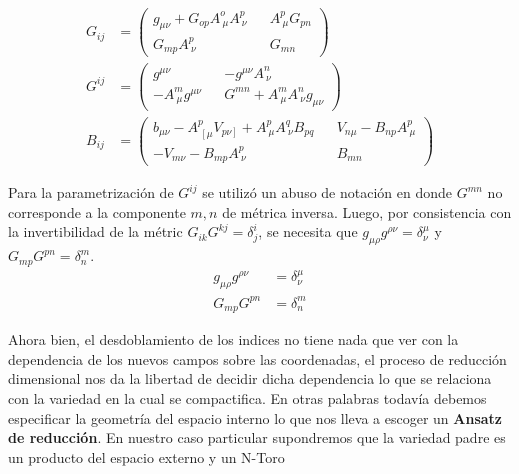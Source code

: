 \documentclass{article}
\numberwithin{equation}{section}
\begin{document}
\begin{subequations}
\begin{align}
\label{Gdown}
G_{i j}&= 
\begin{pmatrix}
g_{\mu \nu} + G_{o p} A^o_{\ \mu} A^p_{\ \nu} && A^p_{\ \mu} G_{p n}\\
G_{m p} A^p_{\ \nu}  && G_{m n}
\end{pmatrix}\\
\label{Gup}
G^{i j} &=
\begin{pmatrix}
g^{\mu \nu}  &&  - g^{\mu \nu} A^n_{\ \nu} \\
- A^m_{\ \mu} g^{\mu \nu}  && G^{m n} + A^m_{\ \mu} A^n_{\ \nu} g_{\mu \nu}
\end{pmatrix}\\
\label{B}
B_{i j} &=
\begin{pmatrix}
b_{\mu \nu} - A^p_{\ \left[\mu \right.} V_{\left. p \nu \right]} + A^p_{\ \mu}A^q_{\ \nu} B_{p q} && V_{n \mu} - B_{n p} A^p_{\ \mu}\\
-V_{m \nu} - B_{m p} A^p_{\ \nu}  && B_{m n}
\end{pmatrix}
\end{align}
\end{subequations}

Para la parametrización de $ G^{i j} $ se utilizó un abuso de notación en donde $ G^{m n} $ no corresponde a la componente $ m, n $ de métrica inversa. Luego, por consistencia con la invertibilidad de la métric $ G_{i k} G^{k j} = \delta^i_j $, se necesita que $ g_{\mu \rho} g^{\rho \nu} = \delta^{\mu}_{\nu} $ y $ G_{m p} G^{p n} = \delta^m_n $.\\

\begin{equation}\label{inversas}
\begin{aligned}
g_{\mu \rho} g^{\rho \nu} &= \delta^{\mu}_{\nu}\\
G_{m p} G^{p n} &= \delta^m_n
\end{aligned}
\end{equation}

Ahora bien, el desdoblamiento de los indices no tiene nada que ver con la dependencia de los nuevos campos sobre las coordenadas, el proceso de reducción dimensional nos da la libertad de decidir dicha dependencia lo que se relaciona con la variedad en la cual se compactifica. En otras palabras todavía debemos especificar la geometría del espacio interno lo que nos lleva a escoger un \textbf{Ansatz de reducción}. En nuestro caso particular supondremos que la variedad padre es un producto del espacio externo y un N-Toro
\end{document}
